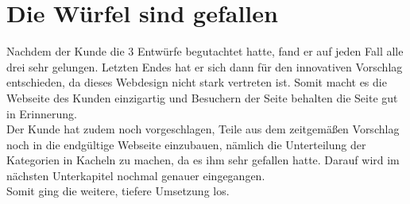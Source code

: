 \section{Die Würfel sind gefallen}
Nachdem der Kunde die 3 Entwürfe begutachtet hatte, fand er auf jeden Fall alle drei sehr gelungen. Letzten Endes hat er sich dann für den innovativen Vorschlag entschieden, da dieses Webdesign nicht stark vertreten ist. Somit macht es die Webseite des Kunden einzigartig und Besuchern der Seite behalten die Seite gut in Erinnerung. 
\\
Der Kunde hat zudem noch vorgeschlagen, Teile aus dem zeitgemäßen Vorschlag noch in die endgültige Webseite einzubauen, nämlich die Unterteilung der Kategorien in Kacheln zu machen, da es ihm sehr gefallen hatte. Darauf wird im nächsten Unterkapitel nochmal genauer eingegangen.
\\
Somit ging die weitere, tiefere Umsetzung los.